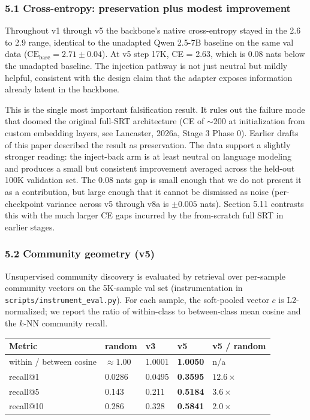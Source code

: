 \documentclass[
  11pt]{article}
\newcounter{none} %
\begin{document}
\subsubsection{5.1 Cross-entropy: preservation plus modest
improvement}\label{cross-entropy-preservation-plus-modest-improvement}

Throughout v1 through v5 the backbone's native cross-entropy stayed in
the 2.6 to 2.9 range, identical to the unadapted Qwen 2.5-7B baseline on
the same val data (\(\text{CE}_{\text{base}} = 2.71 \pm 0.04\)). At v5
step 17K, CE = 2.63, which is \(0.08\) nats below the unadapted
baseline. The injection pathway is not just neutral but mildly helpful,
consistent with the design claim that the adapter exposes information
already latent in the backbone.

This is the single most important falsification result. It rules out the
failure mode that doomed the original full-SRT architecture (CE of
\(\sim 200\) at initialization from custom embedding layers, see
Lancaster, 2026a, Stage 3 Phase 0). Earlier drafts of this paper
described the result as preservation. The data support a slightly
stronger reading: the inject-back arm is at least neutral on language
modeling and produces a small but consistent improvement averaged across
the held-out 100K validation set. The \(0.08\) nats gap is small enough
that we do not present it as a contribution, but large enough that it
cannot be dismissed as noise (per-checkpoint variance across v5 through
v8a is \(\pm 0.005\) nats). Section 5.11 contrasts this with the much
larger CE gaps incurred by the from-scratch full SRT in earlier stages.

\subsubsection{5.2 Community geometry (v5)}\label{community-geometry-v5}

Unsupervised community discovery is evaluated by retrieval over
per-sample community vectors on the 5K-sample val set (instrumentation
in \texttt{scripts/instrument\_eval.py}). For each sample, the
soft-pooled vector \(c\) is L2-normalized; we report the ratio of
within-class to between-class mean cosine and the \(k\)-NN community
recall.

{\def\LTcaptype{none} %
\begin{longtable}[]{@{}lllll@{}}
\toprule\noalign{}
Metric & random & v3 & v5 & v5 / random \\
\midrule\noalign{}
\endhead
\bottomrule\noalign{}
\endlastfoot
within / between cosine & \(\approx 1.00\) & 1.0001 & \textbf{1.0050} &
n/a \\
recall@1 & 0.0286 & 0.0495 & \textbf{0.3595} & \(12.6\times\) \\
recall@5 & 0.143 & 0.211 & \textbf{0.5184} & \(3.6\times\) \\
recall@10 & 0.286 & 0.328 & \textbf{0.5841} & \(2.0\times\) \\
\end{longtable}
}
\end{document}
